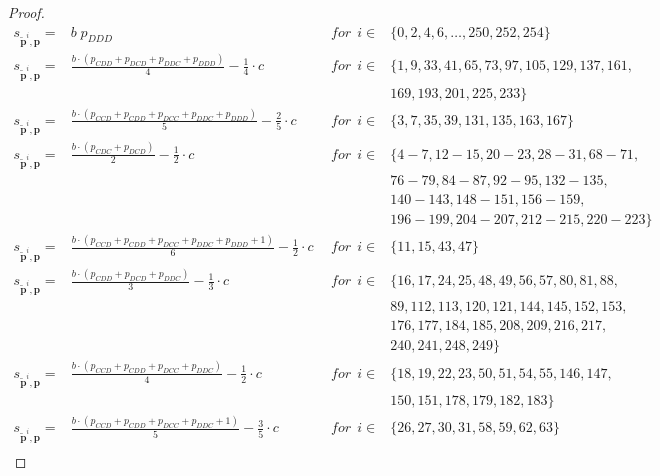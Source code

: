 \documentclass[11pt]{article}
\theoremstyle{plainCl1}
\theoremstyle{plainCl2}
\begin{document}
\begin{proof}
\small{
\begin{equation}\label{Eq:PayoffExpressionsReactiveThree}
\begin{array}{lcll}
  s_{\mathbf{\tilde{p}}^{i}, \mathbf{p}} = & b \; p_{DDD} & ~~for~~ i \in & \{0, 2, 4, 6, \dots, 250, 252, 254\} \\ [0.1cm]
    s_{\mathbf{\tilde{p}}^{i}, \mathbf{p}} = & \frac{b \cdot (p_{CDD} + p_{DCD} + p_{DDC} + p_{DDD})}{4} - \frac{1}{4} \cdot c & ~~for~~ i \in & \{ 1, 9, 33, 41, 65, 73, 97, 105, 129, 137, 161,
    \\ & & &  169, 193, 201, 225, 233\} \\ [0.1cm]
    s_{\mathbf{\tilde{p}}^{i}, \mathbf{p}} = & \frac{b \cdot \left(p_{CCD} + p_{CDD} + p_{DCC} + p_{DDC} + p_{DDD}\right)}{5} - \frac{2}{5} \cdot c & ~~for~~ i \in & \{ 3, 7, 35, 39, 131, 135, 163, 167\} \\ [0.2cm]
    s_{\mathbf{\tilde{p}}^{i}, \mathbf{p}} = & \frac{b \cdot \left(p_{CDC} + p_{DCD}\right)}{2} - \frac{1}{2} \cdot c & ~~for~~ i \in & \{ 4 \!- \!7, 12 \!- \!15, 20 \!- \!23, 28 \!- \!31, 68 \!- \!71,
    \\ & & &  76 \!- \!79, 84 \!- \!87, 92 \!- \!95, 132 \!- \!135, 
    \\ & & & 140 \!- \!143, 148- 151, 156 \!- \!159, 
    \\ & & & 196 \!- \!199, 204 \!- \!207, 212 \!- \!215, 220 \!- \!223\} \\ 
    s_{\mathbf{\tilde{p}}^{i}, \mathbf{p}} = & \frac{b \cdot \left(p_{CCD} + p_{CDD} + p_{DCC} + p_{DDC} + p_{DDD} + 1\right)}{6} - \frac{1}{2} \cdot c & ~~for~~ i \in & \{ 11, 15, 43, 47\} \\ [0.2cm]
    s_{\mathbf{\tilde{p}}^{i}, \mathbf{p}} = & \frac{b \cdot \left(p_{CDD} + p_{DCD} + p_{DDC}\right)}{3} - \frac{1}{3} \cdot c & ~~for~~ i \in & \{16,17,24,25,48,49,56,57,80,81,88,
    \\ & & & 89,112, 113,120,121, 144,145,152,153,
    \\ & & & 176,177,184,185,208,209,216,217,
    \\ & & & 240, 241,248,249\} \\ 
    s_{\mathbf{\tilde{p}}^{i}, \mathbf{p}} = & \frac{b \cdot \left(p_{CCD} + p_{CDD} + p_{DCC} + p_{DDC}\right)}{4} - \frac{1}{2} \cdot c & ~~for~~ i \in & \{ 18, 19, 22, 23, 50, 51, 54, 55, 146, 147,
    \\ & & &  150, 151, 178, 179, 182, 183\} \\ 
    s_{\mathbf{\tilde{p}}^{i}, \mathbf{p}} = & \frac{b \cdot \left(p_{CCD} + p_{CDD} + p_{DCC} + p_{DDC} + 1\right)}{5} - \frac{3}{5} \cdot c & ~~for~~ i \in & \{ 26, 27, 30, 31, 58, 59, 62, 63\} \\ [0.2cm]

\end{array}
\end{equation}}
\end{proof}
\end{document}
